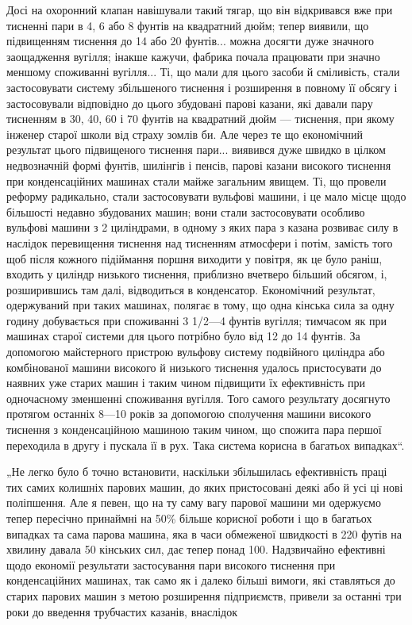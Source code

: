 \parcont{}  %
Досі на охоронний клапан навішували такий тягар, що він відкривався вже при тисненні пари в 4, 6 або
8 фунтів на квадратний
дюйм; тепер виявили, що підвищенням тиснення до 14 або 20 фунтів... можна досягти дуже значного
заощадження вугілля; інакше
кажучи, фабрика почала працювати при значно меншому споживанні вугілля... Ті, що мали для цього
засоби й сміливість, стали
застосовувати систему збільшеного тиснення і розширення в повному її обсягу і застосовували
відповідно до цього збудовані парові казани, які давали пару тисненням в 30, 40, 60 і 70 фунтів на
квадратний дюйм — тиснення, при якому інженер старої школи
від страху зомлів би. Але через те що економічний результат
цього підвищеного тиснення пари... виявився дуже швидко в цілком недвозначній формі фунтів, шилінгів
і пенсів, парові казани
високого тиснення при конденсаційних машинах стали майже загальним явищем. Ті, що провели реформу
радикально, стали застосовувати вульфові машини, і це мало місце щодо більшості недавно
збудованих машин; вони стали застосовувати особливо вульфові
машини з 2 циліндрами, в одному з яких пара з казана розвиває силу в наслідок перевищення тиснення
над тисненням атмосфери і потім, замість того щоб після кожного підіймання поршня
виходити у повітря, як це було раніш, входить у циліндр
низького тиснення, приблизно вчетверо більший обсягом, і, розширившись там далі, відводиться в
конденсатор. Економічний
результат, одержуваний при таких машинах, полягає в тому, що
одна кінська сила за одну годину добувається при споживанні
3 1/2—4 фунтів вугілля; тимчасом як при машинах старої системи
для цього потрібно було від 12 до 14 фунтів. За допомогою
майстерного пристрою вульфову систему подвійного циліндра
або комбінованої машини високого й низького тиснення удалось
пристосувати до наявних уже старих машин і таким чином підвищити їх ефективність при одночасному
зменшенні споживання
вугілля. Того самого результату досягнуто протягом останніх
8—10 років за допомогою сполучення машини високого тиснення
з конденсаційною машиною таким чином, що спожита пара першої переходила в другу і пускала її в рух.
Така система корисна
в багатьох випадках“.

„Не легко було б точно встановити, наскільки збільшилась
ефективність праці тих самих колишніх парових машин, до
яких пристосовані деякі або й усі ці нові поліпшення. Але я певен, що на ту саму вагу парової машини
ми одержуємо тепер
пересічно принаймні на 50\% більше корисної роботи і що в багатьох випадках та сама парова машина,
яка в часи обмеженої
швидкості в 220 футів на хвилину давала 50 кінських сил, дає
тепер понад 100. Надзвичайно ефективні щодо економії результати
застосування пари високого тиснення при конденсаційних машинах, так само як і далеко більші вимоги,
які ставляться до старих парових машин з метою розширення підприємств, привели
за останні три роки до введення трубчастих казанів, внаслідок
\parbreak{}  %
